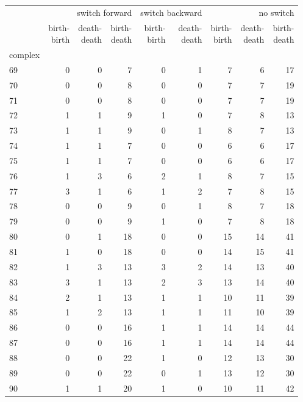 \documentclass{article}
\begin{document}
\begin{center}
\begin{tabular}{lrrrrrrrr}
\toprule
& \multicolumn{3}{r}{switch forward} & \multicolumn{2}{r}{switch backward} & \multicolumn{3}{r}{no switch} \\
& \makecell{birth-\\birth} & \makecell{death-\\death} & \makecell{birth-\\death} & \makecell{birth-\\birth} & \makecell{death-\\death} & \makecell{birth-\\birth} & \makecell{death-\\death} & \makecell{birth-\\death} \\
complex &  &  &  &  &  &  &  &  \\
\midrule
69 & 0 & 0 & 7 & 0 & 1 & 7 & 6 & 17 \\
70 & 0 & 0 & 8 & 0 & 0 & 7 & 7 & 19 \\
71 & 0 & 0 & 8 & 0 & 0 & 7 & 7 & 19 \\
72 & 1 & 1 & 9 & 1 & 0 & 7 & 8 & 13 \\
73 & 1 & 1 & 9 & 0 & 1 & 8 & 7 & 13 \\
74 & 1 & 1 & 7 & 0 & 0 & 6 & 6 & 17 \\
75 & 1 & 1 & 7 & 0 & 0 & 6 & 6 & 17 \\
76 & 1 & 3 & 6 & 2 & 1 & 8 & 7 & 15 \\
77 & 3 & 1 & 6 & 1 & 2 & 7 & 8 & 15 \\
78 & 0 & 0 & 9 & 0 & 1 & 8 & 7 & 18 \\
79 & 0 & 0 & 9 & 1 & 0 & 7 & 8 & 18 \\
80 & 0 & 1 & 18 & 0 & 0 & 15 & 14 & 41 \\
81 & 1 & 0 & 18 & 0 & 0 & 14 & 15 & 41 \\
82 & 1 & 3 & 13 & 3 & 2 & 14 & 13 & 40 \\
83 & 3 & 1 & 13 & 2 & 3 & 13 & 14 & 40 \\
84 & 2 & 1 & 13 & 1 & 1 & 10 & 11 & 39 \\
85 & 1 & 2 & 13 & 1 & 1 & 11 & 10 & 39 \\
86 & 0 & 0 & 16 & 1 & 1 & 14 & 14 & 44 \\
87 & 0 & 0 & 16 & 1 & 1 & 14 & 14 & 44 \\
88 & 0 & 0 & 22 & 1 & 0 & 12 & 13 & 30 \\
89 & 0 & 0 & 22 & 0 & 1 & 13 & 12 & 30 \\
90 & 1 & 1 & 20 & 1 & 0 & 10 & 11 & 42 \\

\end{tabular}
\end{center}
\end{document}

